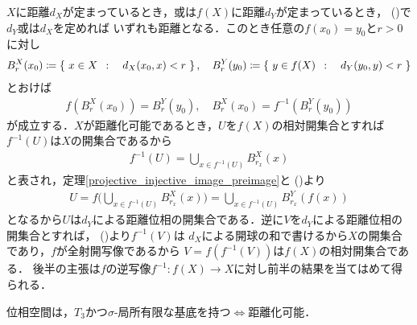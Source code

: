 	\begin{prf}
		$X$に距離$d_X$が定まっているとき，或は$f(X)$に距離$d_Y$が定まっているとき，
		()で$d_Y$或は$d_X$を定めれば
		いずれも距離となる．このとき任意の$f(x_0) = y_0$と$r > 0$に対し
		\begin{align}
			B^X_r(x_0) \coloneqq \left\{\ x \in X\ \, : \quad d_X(x_0,x) < r\ \right\},
			\quad B^Y_r(y_0) \coloneqq \left\{\ y \in f(X)\ \, : \quad d_Y(y_0,y) < r\ \right\}
		\end{align}
		とおけば
		\begin{align}
			f\left(B^X_r(x_0)\right) = B^Y_r(y_0),
			\quad B^X_r(x_0) = f^{-1}\left(B^Y_r(y_0)\right)
			\label{eq:thm_heredity_of_metrizability_2}
		\end{align}
		が成立する．$X$が距離化可能であるとき，$U$を$f(X)$の相対開集合とすれば
		$f^{-1}(U)$は$X$の開集合であるから
		\begin{align}
			f^{-1}(U) = \bigcup_{x \in f^{-1}(U)}B^X_{r_x}(x)
		\end{align}
		と表され，定理\ref{projective_injective_image_preimage}と
		()より
		\begin{align}
			U = f\Biggl(\bigcup_{x \in f^{-1}(U)}B^X_{r_x}(x)\Biggr)
			= \bigcup_{x \in f^{-1}(U)}B^Y_{r_x}(f(x))
		\end{align}
		となるから$U$は$d_Y$による距離位相の開集合である．逆に$V$を$d_Y$による距離位相の開集合とすれば，
		()より$f^{-1}(V)$は
		$d_X$による開球の和で書けるから$X$の開集合であり，$f$が全射開写像であるから
		$V = f\left(f^{-1}(V)\right)$は$f(X)$の相対開集合である．
		後半の主張は$f$の逆写像$f^{-1}:f(X) \longrightarrow X$に対し前半の結果を当てはめて得られる．
		\QED
	\end{prf}
	
	\begin{screen}
		\begin{thm}\label{thm:Nagata_Smirnov_metrizability}
			位相空間は，$\mbox{$T_3$かつ$\sigma$-局所有限な基底を持つ} \Longleftrightarrow \mbox{距離化可能}$．
		\end{thm}
	\end{screen}
	
